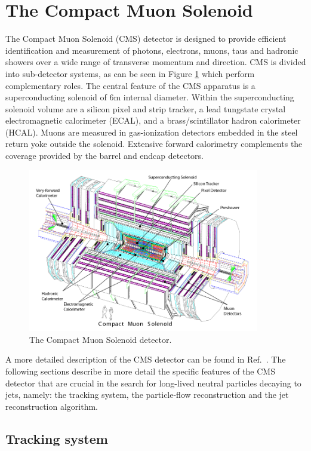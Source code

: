 \section{The Compact Muon Solenoid}

The Compact Muon Solenoid (CMS) detector is designed to provide efficient identification and 
measurement of photons, electrons, muons, taus and hadronic showers over a wide range of 
transverse momentum and direction.
CMS is divided into sub-detector systems, as can be seen in Figure \ref{fig:cms_complete}
which perform complementary roles.
The central feature of the CMS apparatus is a superconducting solenoid of 6\unit{m} internal diameter. Within the superconducting solenoid volume are a silicon pixel and strip tracker, a lead tungstate crystal electromagnetic calorimeter (ECAL), and a brass/scintillator hadron calorimeter (HCAL). Muons are measured in gas-ionization detectors embedded in the steel return yoke outside the solenoid. Extensive forward calorimetry complements the coverage provided by the barrel and endcap detectors. 
\begin{figure}[htbp]
\centering
\includegraphics[width=0.9\textwidth]{plots/intro/cms_complete.png}
\caption{The Compact Muon Solenoid detector.\label{fig:cms_complete}}
\end{figure}

A more detailed description of the CMS detector can be found in Ref.~\cite{Chatrchyan:2008zzk}.  
The following sections describe in more detail the specific features of the CMS detector
that are crucial in the search for long-lived neutral particles decaying to jets, namely: the
tracking system, the particle-flow reconstruction and the jet reconstruction algorithm.

\subsection{Tracking system}


